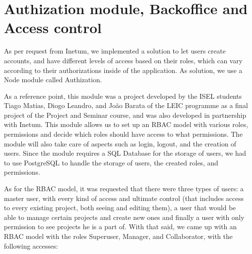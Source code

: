 \documentclass[a4paper,twoside,10pt]{report}
\begin{document}
\newpage
\section{Authization module, Backoffice and Access control}
As per request from Inetum, we implemented a solution to let users create accounts, and have different levels of access based on their roles, which can vary according to their authorizations inside of the application. 
As solution, we use a Node module called Authization\cite{AUTHIZATION}. 

As a reference point, this module was a project developed by the ISEL students Tiago Matias, Diogo Leandro, and João Barata of the LEIC programme as a final project of the Project and Seminar course, and was also developed in partnership with Inetum. This module allows us to set up an RBAC model with various roles, permissions and decide which roles should have access to what permissions. The module will also take care of aspects such as login, logout, and the creation of users. Since the module requires a SQL Database for the storage of users, we had to use PostgreSQL\cite{POSTGRESQL} to handle the storage of users, the created roles, and permissions.

As for the RBAC model, it was requested that there were three types of users: a master user, with every kind of access and ultimate control (that includes access to every existing project, both seeing and editing them), a user that would be able to manage certain projects and create new ones and finally a user with only permission to see projects he is a part of.
With that said, we came up with an RBAC model with the roles Superuser, Manager, and Collaborator, with the following accesses:
 
\end{document}
